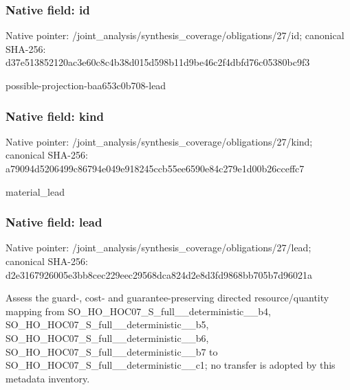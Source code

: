 \documentclass[10pt,a4paper]{article}
\begin{document}
\subsubsection{Native field: id}
Native pointer: /joint\_\allowbreak{}analysis/synthesis\_\allowbreak{}coverage/obligations/27/id; canonical SHA-256: d37e513852120ac3e60c8c4b38d015d598b11d9be46c2f4dbfd76c05380bc9f3

\begingroup\raggedright\sloppy possible-projection-baa653c0b708-lead\par\endgroup

\subsubsection{Native field: kind}
Native pointer: /joint\_\allowbreak{}analysis/synthesis\_\allowbreak{}coverage/obligations/27/kind; canonical SHA-256: a79094d5206499c86794e049e918245ccb55ee6590e84c279e1d00b26cceffc7

\begingroup\raggedright\sloppy material\_\allowbreak{}lead\par\endgroup

\subsubsection{Native field: lead}
Native pointer: /joint\_\allowbreak{}analysis/synthesis\_\allowbreak{}coverage/obligations/27/lead; canonical SHA-256: d2e3167926005e3bb8cec229eec29568dca824d2e8d3fd9868bb705b7d96021a

\begingroup\raggedright\sloppy Assess the guard-,\allowbreak{} cost- and guarantee-preserving directed resource/\allowbreak{}quantity mapping from SO\_\allowbreak{}HO\_\allowbreak{}HOC07\_\allowbreak{}S\_\allowbreak{}full\_\allowbreak{}\_\allowbreak{}deterministic\_\allowbreak{}\_\allowbreak{}b4,\allowbreak{} SO\_\allowbreak{}HO\_\allowbreak{}HOC07\_\allowbreak{}S\_\allowbreak{}full\_\allowbreak{}\_\allowbreak{}deterministic\_\allowbreak{}\_\allowbreak{}b5,\allowbreak{} SO\_\allowbreak{}HO\_\allowbreak{}HOC07\_\allowbreak{}S\_\allowbreak{}full\_\allowbreak{}\_\allowbreak{}deterministic\_\allowbreak{}\_\allowbreak{}b6,\allowbreak{} SO\_\allowbreak{}HO\_\allowbreak{}HOC07\_\allowbreak{}S\_\allowbreak{}full\_\allowbreak{}\_\allowbreak{}deterministic\_\allowbreak{}\_\allowbreak{}b7 to SO\_\allowbreak{}HO\_\allowbreak{}HOC07\_\allowbreak{}S\_\allowbreak{}full\_\allowbreak{}\_\allowbreak{}deterministic\_\allowbreak{}\_\allowbreak{}c1;\allowbreak{} no transfer is adopted by this metadata inventory.\par\endgroup
\end{document}
